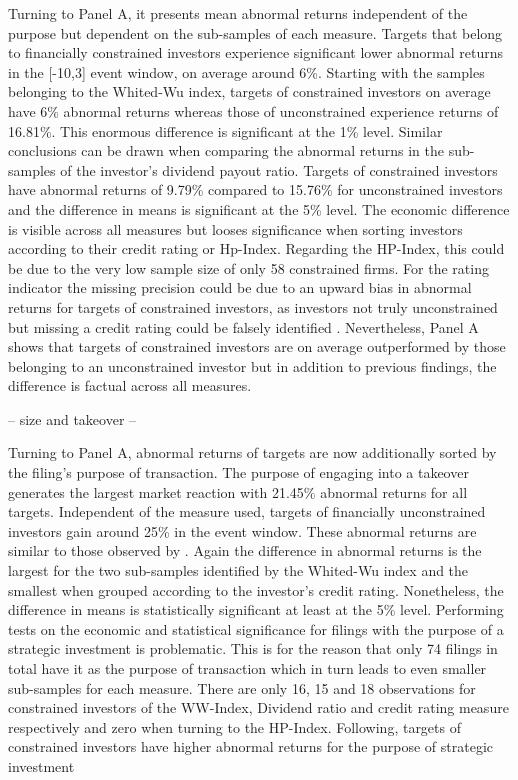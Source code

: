 \documentclass[12pt]{article}
\begin{document}
Turning to Panel A, it presents mean abnormal returns independent of the purpose but  dependent on the sub-samples of each measure. Targets that belong to financially constrained investors experience significant lower abnormal returns in the [-10,3] event window, on average around 6\%. Starting with the samples belonging to the Whited-Wu index,  targets of constrained investors on average have 6\% abnormal returns whereas those of unconstrained experience returns of 16.81\%. This enormous difference is significant at the 1\% level. Similar conclusions can be drawn when comparing the abnormal returns in the sub-samples of the investor's dividend payout ratio. Targets of constrained investors have abnormal returns of 9.79\% compared to 15.76\% for unconstrained investors and the difference in means is significant at the 5\% level. The economic difference is visible across all measures but looses significance when sorting investors according to their credit rating or Hp-Index. Regarding the HP-Index, this could be due to the very low sample size of only 58 constrained firms. For the rating indicator the missing precision could be due to an upward bias in abnormal returns for targets of constrained investors, as investors not truly unconstrained but missing a credit rating could be falsely identified \citep[p.18]{heller2015}. Nevertheless, Panel A shows that targets of constrained investors are on average outperformed by those belonging to an unconstrained investor but in addition to previous findings, the difference is factual across all measures.
\begin{center}
	-- size and takeover -- 
\end{center}
Turning to Panel A, abnormal returns of targets are now additionally sorted by the filing's purpose of transaction. The purpose of engaging into a takeover generates the largest market reaction with 21.45\% abnormal returns for all targets. Independent of the measure used, targets of financially unconstrained investors gain around 25\% in the event window. These abnormal returns are similar to those observed by \citet[p.112]{Khatami2014}. Again the difference in abnormal returns is the largest for the two sub-samples identified by the Whited-Wu index and the smallest when grouped according to the investor's credit rating. Nonetheless, the difference in means is statistically significant at least at the 5\% level. 
Performing tests on the economic and statistical significance for filings with the purpose of a strategic investment is problematic. This is for the reason that only 74 filings in total have it as the purpose of transaction which in turn leads to even smaller sub-samples for each measure. There are only 16, 15 and 18 observations for constrained investors of the WW-Index, Dividend ratio and credit rating measure respectively and zero when turning to the HP-Index.  Following, targets of constrained investors have higher abnormal returns for the purpose of strategic investment 
\end{document}
